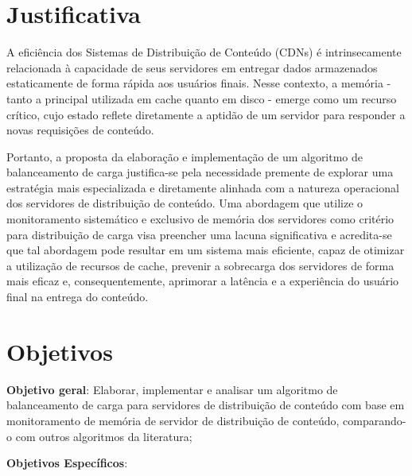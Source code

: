 \section{Justificativa}

A eficiência dos Sistemas de Distribuição de Conteúdo (CDNs) é intrinsecamente relacionada à capacidade de seus servidores em entregar dados armazenados estaticamente de forma rápida aos usuários finais. Nesse contexto, a memória - tanto a principal utilizada em cache quanto em disco - emerge como um recurso crítico, cujo estado reflete diretamente a aptidão de um servidor para responder a novas requisições de conteúdo.

Portanto, a proposta da elaboração e implementação de um algoritmo de balanceamento de carga justifica-se pela necessidade premente de explorar uma estratégia mais especializada e diretamente alinhada com a natureza operacional dos servidores de distribuição de conteúdo. Uma abordagem que utilize o monitoramento sistemático e exclusivo de memória dos servidores como critério para distribuição de carga visa preencher uma lacuna significativa e acredita-se que tal abordagem pode resultar em um sistema mais eficiente, capaz de otimizar a utilização de recursos de cache, prevenir a sobrecarga dos servidores de forma mais eficaz e, consequentemente, aprimorar a latência e a experiência do usuário final na entrega do conteúdo.

\section{Objetivos}

\textbf{Objetivo geral}: Elaborar, implementar e analisar um algoritmo de balanceamento de carga para servidores de distribuição de conteúdo com base em monitoramento de memória de servidor de distribuição de conteúdo, comparando-o com outros algoritmos da literatura;

\noindent\textbf{Objetivos Específicos}:

